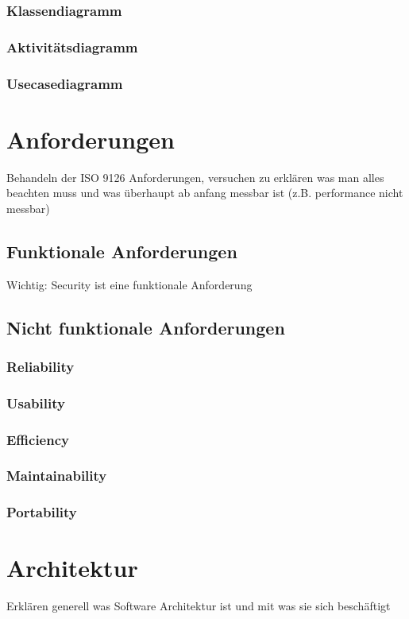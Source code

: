 \documentclass[Master,MSE,german]{twbook}
\begin{document}
\subsection{Klassendiagramm}
\subsection{Aktivitätsdiagramm}
\subsection{Usecasediagramm}


\chapter{Anforderungen}
Behandeln der ISO 9126 Anforderungen, versuchen zu erklären was man alles beachten muss und was überhaupt ab anfang messbar ist (z.B. performance nicht messbar)

\section{Funktionale Anforderungen}
Wichtig: Security ist eine funktionale Anforderung

\section{Nicht funktionale Anforderungen}
\subsection{Reliability}
\subsection{Usability}
\subsection{Efficiency}
\subsection{Maintainability}
\subsection{Portability}

\chapter{Architektur}
Erklären generell was Software Architektur ist und mit was sie sich beschäftigt
\end{document}
